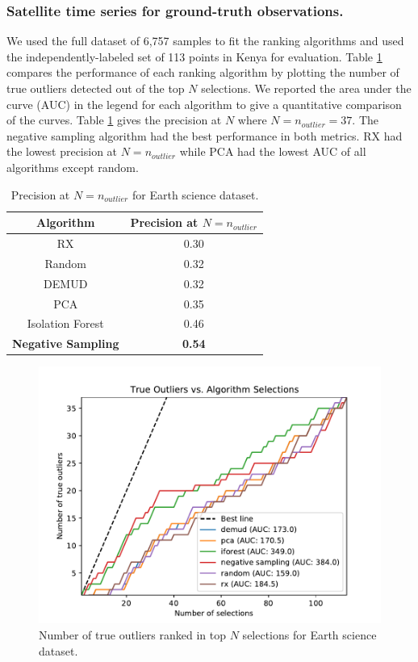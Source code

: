 \documentclass[letterpaper]{article} %
\begin{document}
\subsubsection{Satellite time series for ground-truth observations.}
We used the full dataset of 6,757 samples to fit the ranking algorithms and
used the independently-labeled set of 113 points in Kenya for evaluation.
Table \ref{fig:faw_results} compares the performance of each ranking 
algorithm by plotting the number of true outliers detected out of the top
$N$ selections. We reported the area under the curve (AUC) in the legend
for each algorithm to give a quantitative comparison of the curves.
Table \ref{tab:faw_results} gives the precision at $N$ where
$N=n_{outlier}=37$. The negative sampling algorithm had the best performance
in both metrics. RX had the lowest precision at $N=n_{outlier}$ while PCA had
the lowest AUC of all algorithms except random. 

\begin{table}
  \caption{Precision at $N=n_{outlier}$ for Earth science dataset. }
  \label{tab:faw_results}
  \centering
  \begin{tabular}{cc}
    \hline
    Algorithm & Precision at $N=n_{outlier}$ \\
    \hline
    RX & 0.30 \\
    Random & 0.32 \\
    DEMUD & 0.32 \\
    PCA & 0.35 \\
    Isolation Forest & 0.46 \\
    \textbf{Negative Sampling} & \textbf{0.54} \\
    \hline
  \end{tabular}
\end{table}

\begin{figure}
    \centering
    \includegraphics[width=\linewidth]{figures/faw_combined_plot.pdf}
    \caption{Number of true outliers ranked in top $N$ selections for 
    Earth science dataset.}
    \label{fig:faw_results}
\end{figure}
\end{document}
